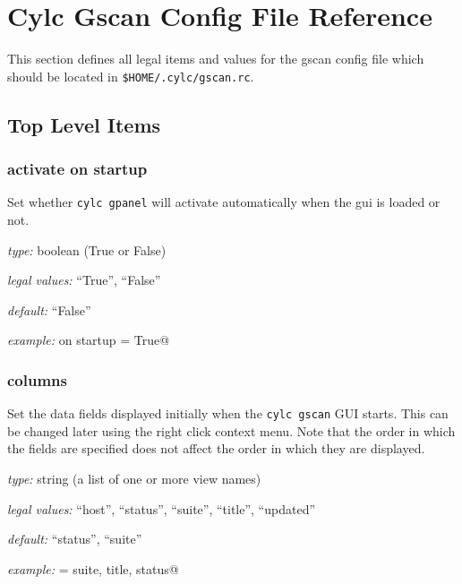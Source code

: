 
\section{Cylc Gscan Config File Reference}
\label{GscanRCReference}

\lstset{language=bash}

This section defines all legal items and values for the gscan config
file which should be located in
\lstinline=$HOME/.cylc/gscan.rc=.

\subsection{Top Level Items}


\subsubsection{activate on startup}
Set whether
\lstinline=cylc gpanel=
will activate automatically when the gui is loaded or not.

\begin{myitemize}
    \item {\em type:} boolean (True or False)
\item {\em legal values:} ``True'', ``False''
\item {\em default:} ``False''
\item {\em example:} \lstinline@activate on startup = True@
\end{myitemize}


\subsubsection{columns}
Set the data fields displayed initially when the
\lstinline=cylc gscan=
GUI starts. This
can be changed later using the right click context menu.
\newline
Note that the order in
which the fields are specified does not affect the order in which they are
displayed.

\begin{myitemize}
\item {\em type:} string (a list of one or more view names)
\item {\em legal values:} ``host'', ``status'', ``suite'',  ``title'',
        ``updated''
\item {\em default:} ``status'', ``suite''
\item {\em example:} \lstinline@columns = suite, title, status@
\end{myitemize}
